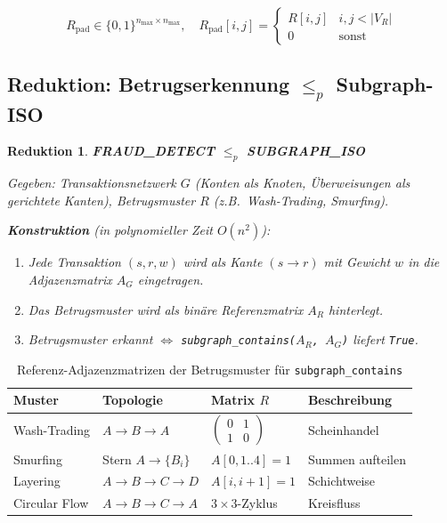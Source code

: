 \documentclass[a4paper,12pt]{article}
\newtheorem{reduktion}{Reduktion}
\begin{document}
\[
    R_{\text{pad}} \in \{0,1\}^{n_{\max} \times n_{\max}}, \quad
    R_{\text{pad}}[i,j] = \begin{cases} R[i,j] & i,j < |V_R| \\ 0 & \text{sonst} \end{cases}
\]

\subsection{Reduktion: Betrugserkennung $\leq_p$ Subgraph-ISO}
\label{sec:fraud_reduce}

\begin{reduktion}
    \textbf{FRAUD\_DETECT $\leq_p$ SUBGRAPH\_ISO}

    Gegeben: Transaktionsnetzwerk $G$ (Konten als Knoten, Überweisungen als
    gerichtete Kanten), Betrugsmuster $R$ (z.B.\ Wash-Trading, Smurfing).

    \textbf{Konstruktion} (in polynomieller Zeit $O(n^2)$):
    \begin{enumerate}
        \item Jede Transaktion $(s, r, w)$ wird als Kante $(s \to r)$
              mit Gewicht $w$ in die Adjazenzmatrix $A_G$ eingetragen.
        \item Das Betrugsmuster wird als binäre Referenzmatrix $A_R$ hinterlegt.
        \item Betrugsmuster erkannt $\Leftrightarrow$ \texttt{subgraph\_contains($A_R$, $A_G$)}
              liefert \texttt{True}.
    \end{enumerate}
\end{reduktion}

\begin{table}[h]
    \centering
    \begin{tabular}{@{}llll@{}}
        \toprule
        \textbf{Muster} & \textbf{Topologie} & \textbf{Matrix $R$} & \textbf{Beschreibung} \\
        \midrule
        Wash-Trading   & $A \to B \to A$   &
            $\begin{pmatrix}0&1\\1&0\end{pmatrix}$ & Scheinhandel \\
        Smurfing       & Stern $A \to \{B_i\}$ &
            $A[0,1..4]=1$ & Summen aufteilen \\
        Layering       & $A{\to}B{\to}C{\to}D$ &
            $A[i,i{+}1]=1$ & Schichtweise \\
        Circular Flow  & $A{\to}B{\to}C{\to}A$ &
            $3{\times}3$-Zyklus & Kreisfluss \\
        \bottomrule
    \end{tabular}
    \caption{Referenz-Adjazenzmatrizen der Betrugsmuster für \texttt{subgraph\_contains}}
    \label{tab:muster}
\end{table}
\end{document}
